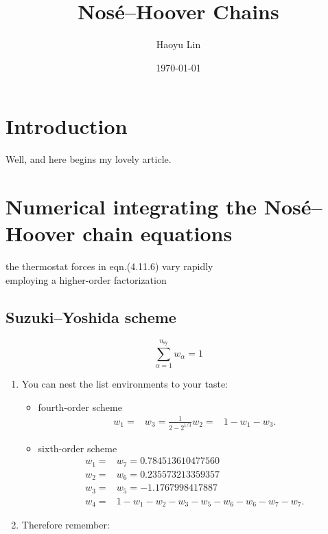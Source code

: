 \documentclass[11pt,a4paper]{article}
\title{Nosé–Hoover Chains}
\author{Haoyu Lin}
\date{\today}
\begin{document}
	\maketitle
	
	\tableofcontents
	
	\section{Introduction}
	Well, and here begins my lovely article. \cite{article-minimal}
	
	\section{Numerical integrating the Nosé–Hoover chain equations}
	the thermostat forces in eqn.(4.11.6) vary rapidly \\
	employing a higher-order factorization \\
	
	\subsection{Suzuki–Yoshida scheme}
	$$\sum_{\alpha=1}^{n_{\mathrm{sy}}} w_{\alpha}=1$$
	\begin{enumerate}
		\item You can nest the list
		environments to your taste:
		\begin{itemize}
			\item fourth-order scheme
			\[
			\begin{aligned}
			w_{1} =& w_{3}=\frac{1}{2-2^{1 / 3}}
			w_{2} =& 1-w_{1}-w_{3}.
			\end{aligned}
			\]
			\item sixth-order scheme
			\[
			\begin{aligned}
			w_{1} =& w_{7}=0.784513610477560 \\
			w_{2} =& w_{6}=0.235573213359357 \\
			w_{3} =& w_{5}=-1.1767998417887 \\
			w_{4} =& 1-w_{1}-w_{2}-w_{3}-w_{5}-w_{6}-w_{6}-w_{7}-w_{7}. \end{aligned}
			\]
		\end{itemize}
		\item Therefore remember:
	\end{enumerate}
\end{document}

